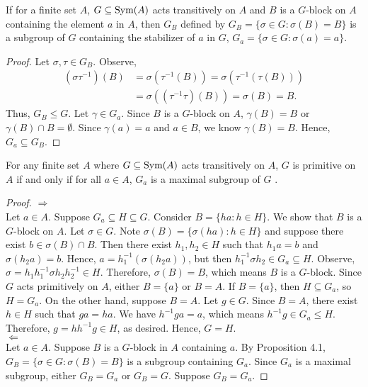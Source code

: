 \begin{proposition}
    If for a finite set $A$, $G\subseteq\text{Sym}(A)$ acts transitively on $A$ and $B$ is a $G$-block on $A$ containing the element $a$ in $A$, then $G_B$ defined by $G_{B}=\{\sigma\in G:\sigma(B)=B\}$ is a subgroup of $G$ containing the stabilizer of $a$ in $G$, $G_a=\{\sigma\in G:\sigma(a)=a\}$.\cite[117]{dummit2004abstract}
\end{proposition}
\begin{proof}
Let $\sigma,\tau\in G_B$. Observe,
\begin{align*}
    (\sigma\tau^{-1})(B)&=\sigma(\tau^{-1}(B))=\sigma(\tau^{-1}(\tau(B)))\\
    &=\sigma((\tau^{-1}\tau)(B))=\sigma(B)=B.
\end{align*}
Thus, $G_B\le G$. Let $\gamma\in G_a$. Since $B$ is a $G$-block on $A$, $\gamma(B)=B$ or $\gamma(B)\cap B=\emptyset$. Since $\gamma(a)=a$ and $a\in B$, we know $\gamma(B)=B$. Hence, $G_a\subseteq G_B$.
\end{proof}
\begin{proposition}\label{prop:prop42}
    For any finite set $A$ where $G\subseteq\text{Sym}(A)$ acts transitively on $A$, $G$ is primitive on $A$ if and only if for all $a\in A$, $G_a$ is a maximal subgroup of $G$ \cite[117]{dummit2004abstract}.  
\end{proposition}
\begin{proof}
    $\Rightarrow$\\Let $a\in A$. Suppose $G_a\subseteq H\subseteq G$. Consider $B=\{ha:h\in H\}$. We show that $B$ is a $G$-block on $A$. Let $\sigma\in G$. Note $\sigma(B)=\{\sigma(ha):h\in H\}$ and suppose there exist $b\in \sigma(B)\cap B$. Then there exist $h_1,h_2\in H$ such that $h_1a=b$ and $\sigma(h_2a)=b$. Hence, $a=h_1^{-1}(\sigma(h_2a))$, but then $h_1^{-1}\sigma h_2\in G_a\subseteq H$. Observe, $\sigma=h_1h_1^{-1}\sigma h_2h_2^{-1}\in H$. Therefore, $\sigma(B)=B$, which means $B$ is a $G$-block. Since $G$ acts primitively on $A$, either $B=\{a\}$ or $B=A$. If $B=\{a\}$, then $H\subseteq G_a$, so $H=G_a$. On the other hand, suppose $B=A$. Let $g\in G$. Since $B=A$, there exist $h\in H$ such that $ga=ha$. We have $h^{-1}ga=a$, which means $h^{-1}g\in G_a\le H$. Therefore, $g=hh^{-1}g\in H$, as desired. Hence,  $G=H$.\\
    $\Leftarrow$\\
    Let $a\in A$. Suppose $B$ is a $G$-block in $A$ containing $a$. By Proposition 4.1, $G_B=\{\sigma\in G:\sigma(B)=B\}$ is a subgroup containing $G_a$. Since $G_a$ is a maximal subgroup, either $G_B=G_a$ or $G_B=G$. Suppose $G_B=G_a$.
\end{proof}
